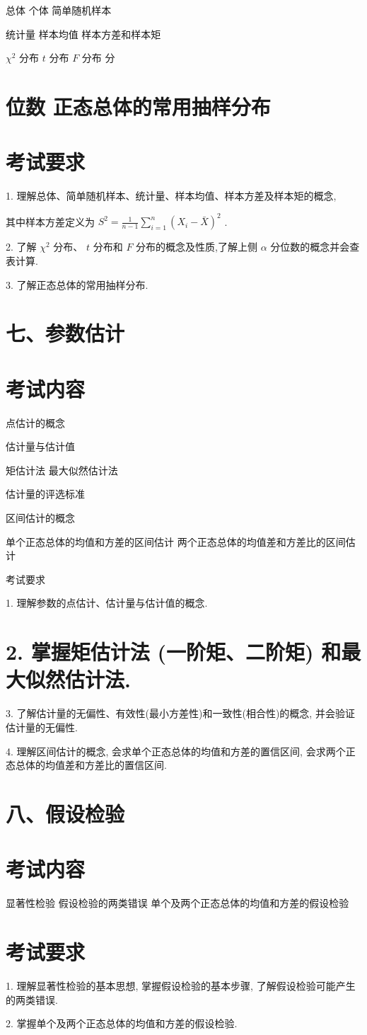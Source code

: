 \documentclass[10pt]{article}
\begin{document}
总体 个体 简单随机样本 

统计量 样本均值 样本方差和样本矩 

\({\chi }^{2}\) 分布 \(t\) 分布 \(F\) 分布 分

\section*{位数 正态总体的常用抽样分布}

\section*{考试要求}

1. 理解总体、简单随机样本、统计量、样本均值、样本方差及样本矩的概念,

其中样本方差定义为 \({S}^{2} = \frac{1}{n - 1}\mathop{\sum }\limits_{{i = 1}}^{n}{\left( {X}_{i} - \bar{X}\right) }^{2}\) .

2. 了解 \({\chi }^{2}\) 分布、 \(t\) 分布和 \(F\) 分布的概念及性质,了解上侧 \(\alpha\) 分位数的概念并会查表计算.

3. 了解正态总体的常用抽样分布.

\section*{七、参数估计}

\section*{考试内容}

点估计的概念 

估计量与估计值 

矩估计法 最大似然估计法 

估计量的评选标准 

区间估计的概念 

单个正态总体的均值和方差的区间估计 两个正态总体的均值差和方差比的区间估计

考试要求

1. 理解参数的点估计、估计量与估计值的概念.

\section*{2. 掌握矩估计法 (一阶矩、二阶矩) 和最大似然估计法.}

3. 了解估计量的无偏性、有效性(最小方差性)和一致性(相合性)的概念, 并会验证估计量的无偏性.

4. 理解区间估计的概念, 会求单个正态总体的均值和方差的置信区间, 会求两个正态总体的均值差和方差比的置信区间.

\section*{八、假设检验}

\section*{考试内容}

显著性检验 假设检验的两类错误 单个及两个正态总体的均值和方差的假设检验

\section*{考试要求}

1. 理解显著性检验的基本思想, 掌握假设检验的基本步骤, 了解假设检验可能产生的两类错误.

2. 掌握单个及两个正态总体的均值和方差的假设检验.
\end{document}
